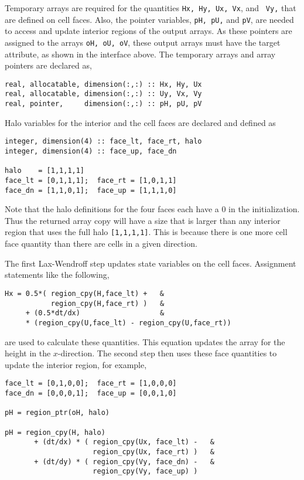 Temporary arrays are required for the quantities {\tt Hx, Hy, Ux, Vx}, and {\tt
  Vy,} that are defined on cell faces.  Also, the pointer variables, {\tt pH,
  pU,} and {\tt pV}, are needed to access and update interior regions of the
output arrays.  As these pointers are assigned to the arrays {\tt oH, oU, oV},
these output arrays must have the target attribute, as shown in the interface
above.  The temporary arrays and array pointers are declared as,

{\small
\begin{verbatim}
real, allocatable, dimension(:,:) :: Hx, Hy, Ux
real, allocatable, dimension(:,:) :: Uy, Vx, Vy
real, pointer,     dimension(:,:) :: pH, pU, pV
\end{verbatim}
}

Halo variables for the interior and the cell faces are declared and defined as

{\small
\begin{verbatim}
integer, dimension(4) :: face_lt, face_rt, halo
integer, dimension(4) :: face_up, face_dn

halo    = [1,1,1,1]
face_lt = [0,1,1,1];  face_rt = [1,0,1,1]
face_dn = [1,1,0,1];  face_up = [1,1,1,0]
\end{verbatim}
}

\noindent
Note that the halo definitions for the four faces each have a 0 in the
initialization. Thus the returned array copy will have a size that is larger
than any interior region that uses the full halo {\tt [1,1,1,1]}.  This is
because there is one more cell face quantity than there are cells in a given
direction.

The first Lax-Wendroff step updates state variables on the cell faces.  Assignment
statements like the following,

{\small
\begin{verbatim}
Hx = 0.5*( region_cpy(H,face_lt) +   &
           region_cpy(H,face_rt) )   &
     + (0.5*dt/dx)                   &
     * (region_cpy(U,face_lt) - region_cpy(U,face_rt))
\end{verbatim}
}

\noindent
are used to calculate these quantities.  This equation updates the array for the
height in the $x$-direction.  The second step then uses these face quantities to
update the interior region, for example,

{\small
\begin{verbatim}
face_lt = [0,1,0,0];  face_rt = [1,0,0,0]
face_dn = [0,0,0,1];  face_up = [0,0,1,0]

pH = region_ptr(oH, halo)

pH = region_cpy(H, halo)
       + (dt/dx) * ( region_cpy(Ux, face_lt) -   &
                     region_cpy(Ux, face_rt) )   &
       + (dt/dy) * ( region_cpy(Vy, face_dn) -   &
                     region_cpy(Vy, face_up) )
\end{verbatim}
}

